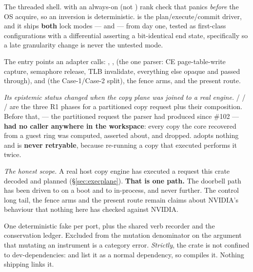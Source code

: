 \documentclass[10.5pt]{article}
\begin{document}
The threaded shell.  with an always-on (not
) rank check that panics \emph{before} the OS acquire, so an inversion is
deterministic.  is the plan/execute/commit driver, and it ships \textbf{both}
lock modes —  and  — from day one, tested as first-class
configurations with a differential asserting a bit-identical end state, specifically so a late
granularity change is never the untested mode.

The entry points an adapter calls: , ,
 (the one parser: CE page-table-write capture, semaphore release,
TLB invalidate, everything else opaque and passed through),
 and  (the Case-1/Case-2 split), the fence arms, and the present route.

\emph{Its epistemic status changed when the copy plane was joined to a real engine.}
 /
 /  /  are the three R1 phases for a
partitioned copy request plus their composition. Before that, 
— the partitioned request the parser had produced since \#102 — \textbf{had no caller anywhere in
the workspace}: every copy the core recovered from a guest ring was computed, asserted about, and
dropped.  adopts nothing and is \textbf{never retryable}, because re-running a
copy that executed performs it twice.

\emph{The honest scope.} A real host copy engine has executed a request this crate decoded and
planned (\S\ref{sec:execplane}). \textbf{That is one path.} The doorbell path has been driven to
 on a boot and to  in-process, and never further. The
control long tail, the fence arms and the present route remain claims about NVIDIA's behaviour
that nothing here has checked against NVIDIA.

One deterministic fake per port, plus the shared verb recorder and the conservation ledger.
Excluded from the mutation denominator on the argument that mutating an instrument is a category
error. \emph{Strictly}, the crate is not confined to dev-dependencies:  and
 list it as a normal dependency, so  compiles it.
Nothing shipping links it.
\end{document}
